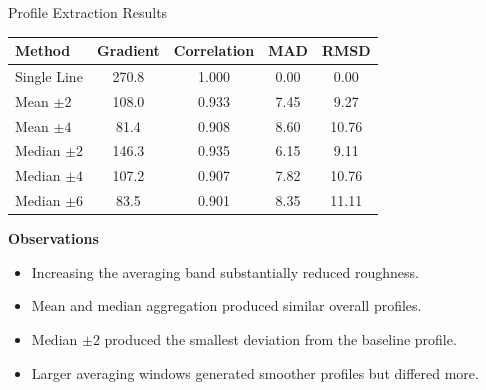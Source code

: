 \documentclass[aspectratio=169]{beamer}
\begin{document}
\begin{frame}{Profile Extraction Results}

\small

\begin{table}
\centering
\begin{tabular}{lcccc}
\toprule
Method &
Gradient &
Correlation &
MAD &
RMSD\\
\midrule
Single Line & 270.8 & 1.000 & 0.00 & 0.00\\
Mean $\pm2$ & 108.0 & 0.933 & 7.45 & 9.27\\
Mean $\pm4$ & 81.4 & 0.908 & 8.60 & 10.76\\
Median $\pm2$ & 146.3 & 0.935 & 6.15 & 9.11\\
Median $\pm4$ & 107.2 & 0.907 & 7.82 & 10.76\\
Median $\pm6$ & 83.5 & 0.901 & 8.35 & 11.11\\
\bottomrule
\end{tabular}
\end{table}

\textbf{Observations}

\begin{itemize}
\item Increasing the averaging band substantially reduced roughness.
\item Mean and median aggregation produced similar overall profiles.
\item Median $\pm2$ produced the smallest deviation from the baseline profile.
\item Larger averaging windows generated smoother profiles but differed more.
\end{itemize}

\end{frame}
\end{document}
